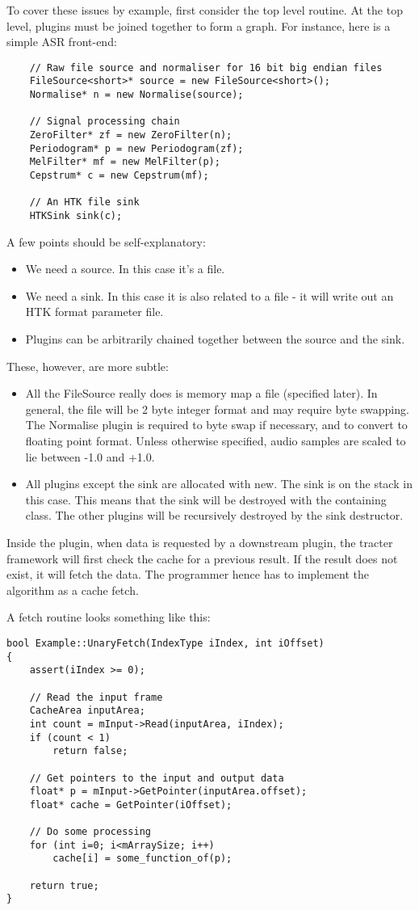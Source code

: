 To cover these issues by example, first consider the top level
routine.  At the top level, plugins must be joined together to form a
graph.  For instance, here is a simple ASR front-end:
\begin{verbatim}
    // Raw file source and normaliser for 16 bit big endian files
    FileSource<short>* source = new FileSource<short>();
    Normalise* n = new Normalise(source);

    // Signal processing chain
    ZeroFilter* zf = new ZeroFilter(n);
    Periodogram* p = new Periodogram(zf);
    MelFilter* mf = new MelFilter(p);
    Cepstrum* c = new Cepstrum(mf);

    // An HTK file sink
    HTKSink sink(c);
\end{verbatim}
A few points should be self-explanatory:
\begin{itemize}
\item We need a source.  In this case it's a file.
\item We need a sink.  In this case it is also related to a file - it
  will write out an HTK format parameter file.
\item Plugins can be arbitrarily chained together between the source
  and the sink.
\end{itemize}
These, however, are more subtle:
\begin{itemize}
\item All the FileSource really does is memory map a file (specified
  later).  In general, the file will be 2 byte integer format and may
  require byte swapping.  The Normalise plugin is required to byte
  swap if necessary, and to convert to floating point format.  Unless
  otherwise specified, audio samples are scaled to lie between -1.0
  and +1.0.
\item All plugins except the sink are allocated with new.  The sink is
  on the stack in this case.  This means that the sink will be
  destroyed with the containing class.  The other plugins will be
  recursively destroyed by the sink destructor.
\end{itemize}

Inside the plugin, when data is requested by a downstream plugin, the
tracter framework will first check the cache for a previous result.
If the result does not exist, it will fetch the data.  The programmer
hence has to implement the algorithm as a cache fetch.

A fetch routine looks something like this:
\begin{verbatim}
bool Example::UnaryFetch(IndexType iIndex, int iOffset)
{
    assert(iIndex >= 0);

    // Read the input frame
    CacheArea inputArea;
    int count = mInput->Read(inputArea, iIndex);
    if (count < 1)
        return false;

    // Get pointers to the input and output data
    float* p = mInput->GetPointer(inputArea.offset);
    float* cache = GetPointer(iOffset);

    // Do some processing
    for (int i=0; i<mArraySize; i++)
        cache[i] = some_function_of(p);

    return true;
}
\end{verbatim}


